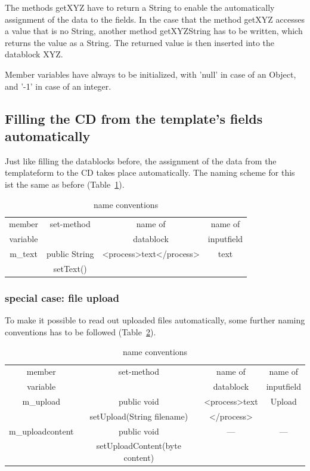 The methods {\name getXYZ} have to return a String to enable the automatically assignment
of the data to the fields. In the case that the method {\name getXYZ} accesses a value
that is no String, another method {\name getXYZString} has to be written, which returns 
the value as a String.
The returned value is then inserted into the datablock {\name XYZ}.

Member variables have always to be initialized, with 'null' in case of an Object,
and '-1' in case of an integer.

\subsection{Filling the CD from the template's fields automatically}
Just like filling the datablocks before, the assignment of the data from the 
templateform to the CD takes place automatically. The naming scheme for this 
ist the same as before (Table~\ref{nameConv2}).

\begin{table}
\begin{center}
\begin{tabular}{|c|c|c|c|}
\hline
member &
set-method&
name of&  
name of \\
variable&
&
datablock&
inputfield\\ \hline  
m\_text&
public String&
<process>text</process>&
text\\
&
setText()&
&  \\ \hline
\end{tabular}
\caption[name conventions]{name conventions}
\label{nameConv2}
\end{center} 
\end{table}

\subsubsection{special case: file upload}
To make it possible to read out uploaded files automatically, some further
naming conventions has to be followed (Table~\ref{nameConv3}).

\begin{table}
\begin{center}
\begin{tabular}{|c|c|c|c|}
\hline
member &
set-method&
name of&  
name of \\
variable&
&
datablock&
inputfield\\ \hline  
m\_upload&
public void&
<process>text&
Upload\\
&
setUpload(String filename)&
</process>&  \\ \hline
m\_uploadcontent&
public void&
---&
---\\
&
setUploadContent(byte content)&
& \\ \hline

\end{tabular}
\caption[name conventions]{name conventions}
\label{nameConv3}
\end{center} 
\end{table}

